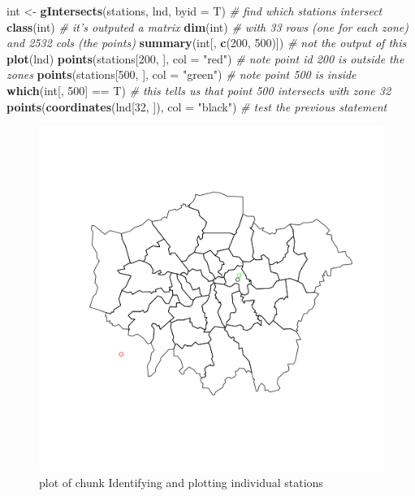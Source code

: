 \documentclass[]{article}
\makeatletter
\newenvironment{Shaded}{}{}
\newcommand{\KeywordTok}[1]{\textcolor[rgb]{0.00,0.44,0.13}{\textbf{{#1}}}}
\newcommand{\DataTypeTok}[1]{\textcolor[rgb]{0.56,0.13,0.00}{{#1}}}
\newcommand{\DecValTok}[1]{\textcolor[rgb]{0.25,0.63,0.44}{{#1}}}
\newcommand{\StringTok}[1]{\textcolor[rgb]{0.25,0.44,0.63}{{#1}}}
\newcommand{\CommentTok}[1]{\textcolor[rgb]{0.38,0.63,0.69}{\textit{{#1}}}}
\newcommand{\NormalTok}[1]{{#1}}
\def\maxwidth{\ifdim\Gin@nat@width>\linewidth\linewidth
\else\Gin@nat@width\fi}
\let\Oldincludegraphics\includegraphics
\renewcommand{\includegraphics}[1]{\Oldincludegraphics[width=\maxwidth]{#1}}
\makeatother
\begin{document}
\begin{Shaded}
\begin{Highlighting}[]
\NormalTok{int <- }\KeywordTok{gIntersects}\NormalTok{(stations, lnd, }\DataTypeTok{byid =} \NormalTok{T)  }\CommentTok{# find which stations intersect }
\KeywordTok{class}\NormalTok{(int)  }\CommentTok{# it's outputed a matrix}
\KeywordTok{dim}\NormalTok{(int)  }\CommentTok{# with 33 rows (one for each zone) and 2532 cols (the points)}
\KeywordTok{summary}\NormalTok{(int[, }\KeywordTok{c}\NormalTok{(}\DecValTok{200}\NormalTok{, }\DecValTok{500}\NormalTok{)])  }\CommentTok{# not the output of this}
\KeywordTok{plot}\NormalTok{(lnd)}
\KeywordTok{points}\NormalTok{(stations[}\DecValTok{200}\NormalTok{, ], }\DataTypeTok{col =} \StringTok{"red"}\NormalTok{)  }\CommentTok{# note point id 200 is outside the zones}
\KeywordTok{points}\NormalTok{(stations[}\DecValTok{500}\NormalTok{, ], }\DataTypeTok{col =} \StringTok{"green"}\NormalTok{)  }\CommentTok{# note point 500 is inside}
\KeywordTok{which}\NormalTok{(int[, }\DecValTok{500}\NormalTok{] == T)  }\CommentTok{# this tells us that point 500 intersects with zone 32}
\KeywordTok{points}\NormalTok{(}\KeywordTok{coordinates}\NormalTok{(lnd[}\DecValTok{32}\NormalTok{, ]), }\DataTypeTok{col =} \StringTok{"black"}\NormalTok{)  }\CommentTok{# test the previous statement}
\end{Highlighting}
\end{Shaded}
\begin{figure}[htbp]
\centering
\includegraphics{figure/Identifying_and_plotting_individual_stations.png}
\caption{plot of chunk Identifying and plotting individual stations}
\end{figure}
\end{document}
